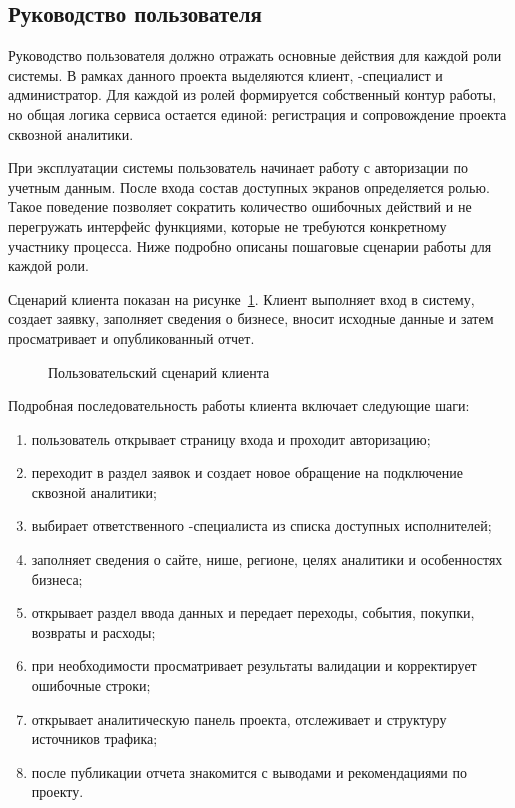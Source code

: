\subsection{Руководство пользователя}

Руководство пользователя должно отражать основные действия для каждой роли системы. В рамках данного проекта выделяются клиент, -специалист и администратор. Для каждой из ролей формируется собственный контур работы, но общая логика сервиса остается единой: регистрация и сопровождение проекта сквозной аналитики.

При эксплуатации системы пользователь начинает работу с авторизации по учетным данным. После входа состав доступных экранов определяется ролью. Такое поведение позволяет сократить количество ошибочных действий и не перегружать интерфейс функциями, которые не требуются конкретному участнику процесса. Ниже подробно описаны пошаговые сценарии работы для каждой роли.

Сценарий клиента показан на рисунке~\ref{fig:test-user-guide-client}. Клиент выполняет вход в систему, создает заявку, заполняет сведения о бизнесе, вносит исходные данные и затем просматривает  и опубликованный отчет.

\begin{figure}[H]
    \centering
    \caption{Пользовательский сценарий клиента}
    \label{fig:test-user-guide-client}
\end{figure}

Подробная последовательность работы клиента включает следующие шаги:
\begin{enumerate}
    \item пользователь открывает страницу входа и проходит авторизацию;
    \item переходит в раздел заявок и создает новое обращение на подключение сквозной аналитики;
    \item выбирает ответственного -специалиста из списка доступных исполнителей;
    \item заполняет сведения о сайте, нише, регионе, целях аналитики и особенностях бизнеса;
    \item открывает раздел ввода данных и передает переходы, события, покупки, возвраты и расходы;
    \item при необходимости просматривает результаты валидации и корректирует ошибочные строки;
    \item открывает аналитическую панель проекта, отслеживает  и структуру источников трафика;
    \item после публикации отчета знакомится с выводами и рекомендациями по проекту.
\end{enumerate}

